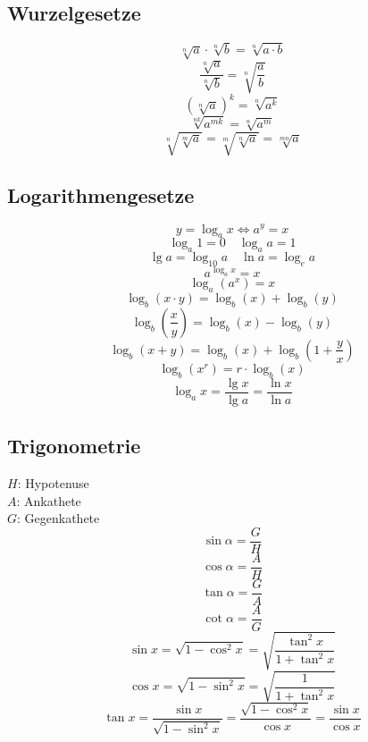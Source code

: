 \subsection{Wurzelgesetze}
\[ \boxed{\sqrt[n]{a}\cdot \sqrt[n]{b}=\sqrt[n]{a\cdot b}} \]
\[ \boxed{\frac{\sqrt[n]{a}}{\sqrt[n]{b}}=\sqrt[n]{\frac{a}{b}}} \]
\[ \boxed{\left(\sqrt[n]{a}\right)^k=\sqrt[n]{a^k}} \]
\[ \boxed{\sqrt[nk]{a^{mk}}=\sqrt[n]{a^m}} \]
\[ \boxed{\sqrt[n]{\sqrt[m]{a}}=\sqrt[m]{\sqrt[n]{a}}=\sqrt[mn]{a}} \]

\subsection{Logarithmengesetze}
\[ \boxed{y=\log_ax \Leftrightarrow a^y=x} \]
\[ \boxed{\log_a1=0 \quad \log_aa=1} \]
\[ \boxed{\lg a=\log_{10}a \quad \ln a = \log_ea} \]
\[ \boxed{a^{\log_ax}=x} \]
\[ \boxed{\log_a\left(a^x\right)=x} \]
\[ \boxed{\log_b\left(x \cdot y\right) = \log_b\left(x\right) + \log_b\left(y\right)} \]
\[ \boxed{\log_b \left( \frac{x}{y} \right) = \log_b\left(x\right) - \log_b\left(y\right)} \]
\[ \boxed{\log_b\left(x + y\right) = \log_b\left(x\right) + \log_b\left(1 + \frac{y}{x}\right)} \]
\[ \boxed{\log_b\left(x^r\right) = r \cdot \log_b\left(x\right)} \]
\[ \boxed{\log_ax=\frac{\lg x}{\lg a}=\frac{\ln x}{\ln a}} \]

\subsection{Trigonometrie}
$H$: Hypotenuse\\
$A$: Ankathete\\
$G$: Gegenkathete
\[ \boxed{\sin\alpha=\frac{G}{H}} \]
\[ \boxed{\cos\alpha=\frac{A}{H}} \]
\[ \boxed{\tan\alpha=\frac{G}{A}} \]
\[ \boxed{\cot\alpha=\frac{A}{G}} \]
\[ \boxed{\sin x = \sqrt{1-\cos^2x} = \sqrt{\frac{\tan^2x}{1+\tan^2x}}} \]
\[ \boxed{\cos x = \sqrt{1-\sin^2x} = \sqrt{\frac{1}{1+\tan^2x}}} \]
\[ \boxed{\tan x = \frac{\sin x}{\sqrt{1-\sin^2x}} = \frac{\sqrt{1-\cos^2x}}{\cos x} = \frac{\sin x}{\cos x}} \]

